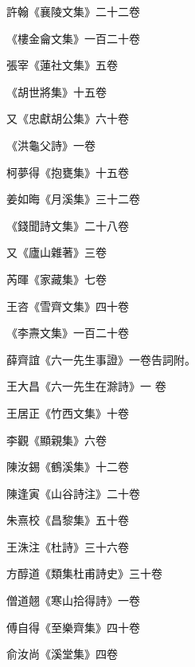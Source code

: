 \begin{pinyinscope}
 許翰《襄陵文集》二十二卷



 《樓金龠文集》一百二十卷



 張宰《蓮社文集》五卷



 《胡世將集》十五卷



 又《忠獻胡公集》六十卷



 《洪龜父詩》一卷



 柯夢得《抱甕集》十五卷



 姜如晦《月溪集》三十二卷



 《錢聞詩文集》二十八卷



 又《廬山雜著》三卷



 芮暉《家藏集》七卷



 王咨《雪齊文集》四十卷



 《李燾文集》一百二十卷



 薛齊誼《六一先生事證》一卷告詞附。



 王大昌《六一先生在滁詩》一
 卷



 王居正《竹西文集》十卷



 李觀《顯親集》六卷



 陳汝錫《鶴溪集》十二卷



 陳逢寅《山谷詩注》二十卷



 朱熹校《昌黎集》五十卷



 王洙注《杜詩》三十六卷



 方醇道《類集杜甫詩史》三十卷



 僧道翹《寒山拾得詩》一卷



 傅自得《至樂齊集》四十卷



 俞汝尚《溪堂集》四卷




\end{pinyinscope}
